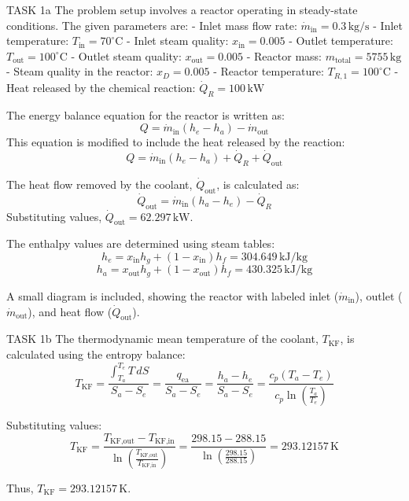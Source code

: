 TASK 1a  
The problem setup involves a reactor operating in steady-state conditions. The given parameters are:  
- Inlet mass flow rate: \( \dot{m}_{\text{in}} = 0.3 \, \text{kg/s} \)  
- Inlet temperature: \( T_{\text{in}} = 70^\circ\text{C} \)  
- Inlet steam quality: \( x_{\text{in}} = 0.005 \)  
- Outlet temperature: \( T_{\text{out}} = 100^\circ\text{C} \)  
- Outlet steam quality: \( x_{\text{out}} = 0.005 \)  
- Reactor mass: \( m_{\text{total}} = 5755 \, \text{kg} \)  
- Steam quality in the reactor: \( x_D = 0.005 \)  
- Reactor temperature: \( T_{R,1} = 100^\circ\text{C} \)  
- Heat released by the chemical reaction: \( \dot{Q}_R = 100 \, \text{kW} \)  

The energy balance equation for the reactor is written as:  
\[
Q = \dot{m}_{\text{in}} (h_e - h_a) - \dot{m}_{\text{out}}
\]  
This equation is modified to include the heat released by the reaction:  
\[
Q = \dot{m}_{\text{in}} (h_e - h_a) + \dot{Q}_R + \dot{Q}_{\text{out}}
\]  

The heat flow removed by the coolant, \( \dot{Q}_{\text{out}} \), is calculated as:  
\[
\dot{Q}_{\text{out}} = \dot{m}_{\text{in}} (h_a - h_e) - \dot{Q}_R  
\]  
Substituting values, \( \dot{Q}_{\text{out}} = 62.297 \, \text{kW} \).  

The enthalpy values are determined using steam tables:  
\[
h_e = x_{\text{in}} h_g + (1 - x_{\text{in}}) h_f = 304.649 \, \text{kJ/kg}  
\]  
\[
h_a = x_{\text{out}} h_g + (1 - x_{\text{out}}) h_f = 430.325 \, \text{kJ/kg}  
\]  

A small diagram is included, showing the reactor with labeled inlet (\( \dot{m}_{\text{in}} \)), outlet (\( \dot{m}_{\text{out}} \)), and heat flow (\( \dot{Q}_{\text{out}} \)).  

TASK 1b  
The thermodynamic mean temperature of the coolant, \( T_{\text{KF}} \), is calculated using the entropy balance:  
\[
T_{\text{KF}} = \frac{\int_{T_a}^{T_e} T \, dS}{S_a - S_e} = \frac{q_{\text{ea}}}{S_a - S_e} = \frac{h_a - h_e}{S_a - S_e} = \frac{c_p (T_a - T_e)}{c_p \ln \left( \frac{T_a}{T_e} \right)}  
\]  

Substituting values:  
\[
T_{\text{KF}} = \frac{T_{\text{KF,out}} - T_{\text{KF,in}}}{\ln \left( \frac{T_{\text{KF,out}}}{T_{\text{KF,in}}} \right)} = \frac{298.15 - 288.15}{\ln \left( \frac{298.15}{288.15} \right)} = 293.12157 \, \text{K}  
\]  

Thus, \( T_{\text{KF}} = 293.12157 \, \text{K} \).